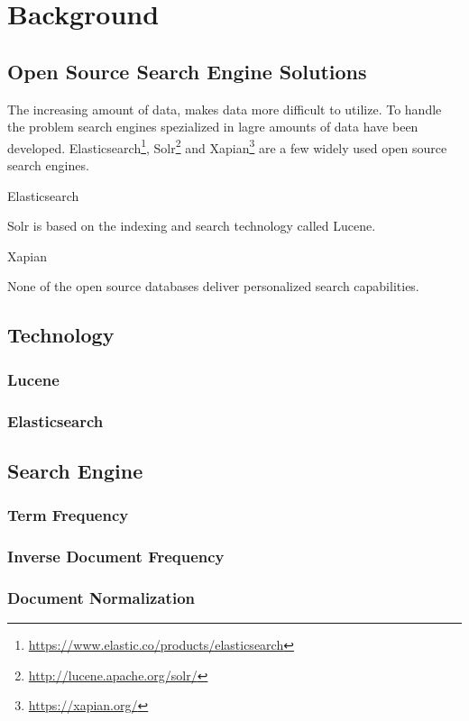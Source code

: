\chapter{Background}
\label{ch:background}

\section{Open Source Search Engine Solutions}
The increasing amount of data, makes data more difficult to utilize.
To handle the problem search engines spezialized in lagre amounts of data have been developed.
Elasticsearch\footnote{\url{https://www.elastic.co/products/elasticsearch}},
Solr\footnote{\url{http://lucene.apache.org/solr/}} and Xapian\footnote{\url{https://xapian.org/}} are a few widely used open source search engines.

Elasticsearch

Solr is based on the indexing and search technology called Lucene.

Xapian

None of the open source databases deliver personalized search capabilities.

\section{Technology}

\subsection{Lucene}

\subsection{Elasticsearch}

\section{Search Engine}

\subsection{Term Frequency}

\subsection{Inverse Document Frequency}

\subsection{Document Normalization}

